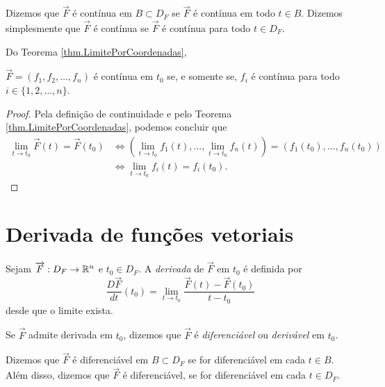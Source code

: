 \begin{remark}
    Dizemos que \(\overrightarrow{F}\) é contínua em \(B\subset D_F\) se \(\overrightarrow{F}\) é contínua em todo \(t\in B\). Dizemos simplesmente que \(\overrightarrow{F}\) é contínua se \(\overrightarrow{F}\) é contínua para todo \(t\in D_F\).
\end{remark}

Do Teorema \ref{thm.LimitePorCoordenadas},

\begin{proposition}
    \(\overrightarrow{F} = (f_1,f_2,\dots,f_n)\) é contínua em \(t_0\) se, e somente se, \(f_i\) é contínua para todo \(i\in\{1,2,\dots,n\}\).
\end{proposition}

\begin{proof}
    Pela definição de continuidade e pelo Teorema \ref{thm.LimitePorCoordenadas}, podemos concluir que
        \begin{align*}
            \lim_{t\to t_0} \overrightarrow{F}(t) = \overrightarrow{F}(t_0)
                & \Leftrightarrow \left( \lim_{t\to t_0}f_1(t),\dots, \lim_{t\to t_0} f_n(t) \right) = (f_1(t_0),\dots,f_n(t_0)) \\
                & \Leftrightarrow \lim_{t\to t_0} f_i(t) = f_i(t_0).
        \end{align*}
\end{proof}

\section{Derivada de funções vetoriais}

\begin{definition}
    Sejam \(\overrightarrow{F}:D_F \to \mathbb{R}^n\) e \(t_0\in D_F\). A \textit{derivada}\label{Funções vetorias!Derivada} de \(\overrightarrow{F}\) em \(t_0\) é definida por \[\frac{D\overrightarrow{F}}{dt} (t_0) = \lim_{t\to t_0} \frac{\overrightarrow{F}(t) - \overrightarrow{F}(t_0)}{t-t_0}\] desde que o limite exista.
\end{definition}

\begin{remark}
    Se \(\overrightarrow{F}\) admite derivada em \(t_0\), dizemos que \(\overrightarrow{F}\) é \textit{diferenciável} ou \textit{derivável} em \(t_0\).
\end{remark}

\begin{remark}
    Dizemos que \(\overrightarrow{F}\) é diferenciável em \(B\subset D_F\) se for diferenciável em cada \(t\in B\). Além disso, dizemos que \(\overrightarrow{F}\) é diferenciável, se for diferenciável em cada \(t\in D_F\).
\end{remark}

